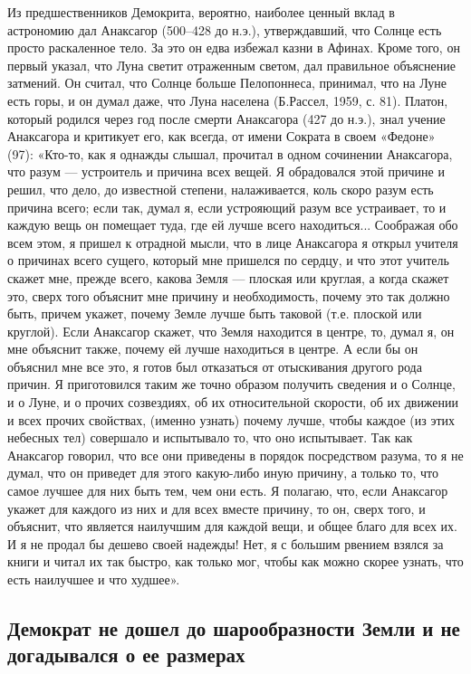 Из  предшественников  Демокрита,  вероятно, наиболее  ценный  вклад  в
астрономию дал Анаксагор (500--428  до н.э.), утверждавший, что Солнце
есть просто раскаленное  тело. За это он едва избежал  казни в Афинах.
Кроме  того, он  первый  указал, что  Луна  светит отраженным  светом,
дал  правильное  объяснение затмений.  Он  считал,  что Солнце  больше
Пелопоннеса, принимал,  что на Луне  есть горы,  и он думал  даже, что
Луна населена (Б.Рассел,  1959, с. 81). Платон,  который родился через
год после  смерти Анаксагора (427  до н.э.), знал учение  Анаксагора и
критикует его,  как всегда,  от имени Сократа  в своем  «Федоне» (97):
«Кто-то, как я однажды слышал,  прочитал в одном сочинении Анаксагора,
что  разум ---  устроитель и  причина всех  вещей. Я  обрадовался этой
причине и  решил, что дело,  до известной степени,  налаживается, коль
скоро разум  есть причина  всего; если так,  думал я,  если устрояющий
разум все устраивает, то и каждую  вещь он помещает туда, где ей лучше
всего  находиться... Соображая  обо  всем этом,  я  пришел к  отрадной
мысли, что в лице Анаксагора я открыл учителя о причинах всего сущего,
который мне пришелся по сердцу, и  что этот учитель скажет мне, прежде
всего, какова Земля --- плоская или круглая, а когда скажет это, сверх
того объяснит мне причину и необходимость, почему это так должно быть,
причем  укажет, почему  Земле  лучше быть  таковой  (т.е. плоской  или
круглой). Если  Анаксагор скажет,  что Земля  находится в  центре, то,
думал я, он мне объяснит также, почему ей лучше находиться в центре. А
если бы он объяснил мне все это, я готов был отказаться от отыскивания
другого рода  причин. Я приготовился  таким же точно  образом получить
сведения  и  о  Солнце,  и  о  Луне, и  о  прочих  созвездиях,  об  их
относительной  скорости,  об  их  движении и  всех  прочих  свойствах,
(именно  узнать) почему  лучше, чтобы  каждое (из  этих небесных  тел)
совершало  и испытывало  то,  что оно  испытывает.  Так как  Анаксагор
говорил, что все  они приведены в порядок посредством разума,  то я не
думал, что он приведет для этого какую-либо иную причину, а только то,
что самое лучшее для них быть тем,  чем они есть. Я полагаю, что, если
Анаксагор укажет для каждого из них  и для всех вместе причину, то он,
сверх  того, и  объяснит, что  является наилучшим  для каждой  вещи, и
общее благо для всех их. И я не продал бы дешево своей надежды! Нет, я
с большим  рвением взялся за книги  и читал их так  быстро, как только
мог, чтобы как можно скорее узнать, что есть наилучшее и что худшее».

\subsection{Демократ не дошел до шарообразности Земли и не догадывался
о ее размерах}

